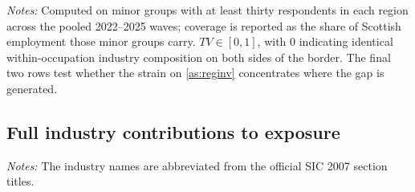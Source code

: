 \begin{table}[h]
\centering
\caption{Within-occupation industry divergence and the implied bias bound}
\label{tab:industryinvariance}
\small

\begin{minipage}{0.92\textwidth}
\vspace{0.4em}\footnotesize
\textit{Notes:} Computed on minor groups with at least thirty respondents in each region across the pooled 2022--2025 waves; coverage is reported as the share of Scottish employment those minor groups carry. $TV \in [0,1]$, with 0 indicating identical within-occupation industry composition on both sides of the border. The final two rows test whether the strain on \cref{as:reginv} concentrates where the gap is generated.
\end{minipage}
\end{table}

\subsection{Full industry contributions to exposure}

\begin{table}[H]
\centering
\caption{Industry-mix and within-industry contributions by SIC section}
\label{tab:industrysections}
\footnotesize
\setlength{\tabcolsep}{4pt}
\renewcommand{\arraystretch}{0.95}

\begin{minipage}{0.92\textwidth}
\vspace{0.4em}\footnotesize
\textit{Notes:} The industry names are abbreviated from the official SIC 2007 section titles.
\end{minipage}
\end{table}

